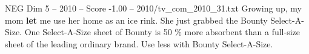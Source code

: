 \begin{textsample}{NEG Dim 5 – 2010 – Score -1.00 – 2010/tv\_com\_2010\_31.txt}  \label{ex:f5_neg_030}
Growing up, my mom \textbf{let} me use her home as an ice rink.
She just grabbed the Bounty Select-A-Size.
One Select-A-Size sheet of Bounty is 50 \% more absorbent than a full-size sheet of the leading ordinary brand.
Use less with Bounty Select-A-Size.

\end{textsample}
